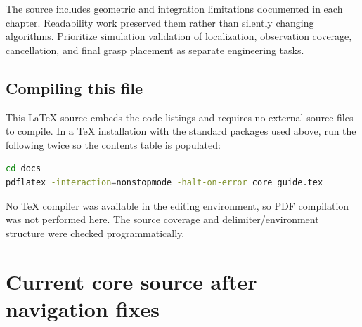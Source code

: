\documentclass[11pt,a4paper]{book}
\begin{document}
The source includes geometric and integration limitations documented in each chapter. Readability work preserved them rather than silently changing algorithms. Prioritize simulation validation of localization, observation coverage, cancellation, and final grasp placement as separate engineering tasks.

\section*{Compiling this file}

This LaTeX source embeds the code listings and requires no external source files to compile. In a TeX installation with the standard packages used above, run the following twice so the contents table is populated:

\begin{lstlisting}[language=bash,numbers=none]
cd docs
pdflatex -interaction=nonstopmode -halt-on-error core_guide.tex
\end{lstlisting}

No TeX compiler was available in the editing environment, so PDF compilation was not performed here. The source coverage and delimiter/environment structure were checked programmatically.


\appendix
\chapter{Current core source after navigation fixes}
\end{document}
